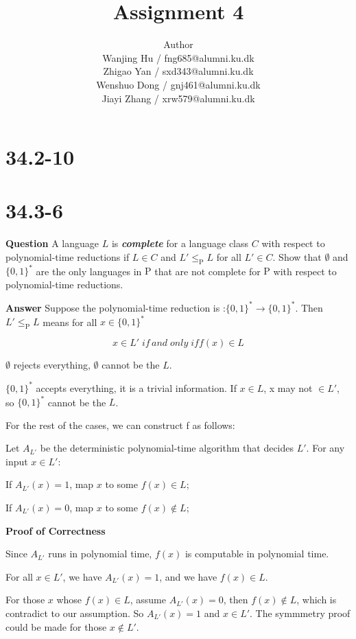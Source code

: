 \documentclass[12pt]{article}
\title{Assignment 4}
\author{Author \\
  Wanjing Hu / fng685@alumni.ku.dk  \\
  Zhigao Yan / sxd343@alumni.ku.dk  \\
  Wenshuo Dong / gnj461@alumni.ku.dk  \\
  Jiayi Zhang / xrw579@alumni.ku.dk \\
}
\begin{document}
\maketitle

\section{34.2-10}

\section{34.3-6}
\textbf{Question}
 A language $L$ is \textit{\textbf{complete}} for a language class $C$ with respect to polynomial-time reductions if $L \in C$ and $L' \le_\text{P} L$ for all $L' \in C$. Show that $\emptyset$ and $\{0, 1\}^{*}$ are the only languages in $\text{P}$ that are not complete for $\text{P}$ with respect to polynomial-time reductions.

\textbf{Answer}
Suppose the polynomial-time reduction is :$\{0, 1\}^{*} \rightarrow \{0, 1\}^{*}$. Then $L' \le_\text{P} L$ means for all $x \in \{0,1\}^{*}$

\begin{equation}
x \in L' \; if \, and \; only \; if f(x) \in  L
\end{equation}

$\emptyset$ rejects everything, $\emptyset$  cannot be the $L$.

$\{0, 1\}^{*}$ accepts everything, it is a trivial information. If $x \in L$, x may not $\in L'$, so  $\{0, 1\}^{*}$  cannot be the $L$.

For the rest of the cases, we can construct f as follows:

Let $A_{L'}$ be the deterministic polynomial-time algorithm that decides $L'$. For any input $x \in L'$:

If $A_{L'}(x)=1$, map $x$ to some $f(x) \in L$;

If $A_{L'}(x)=0$, map $x$ to some $f(x) \notin L$;

\textbf{Proof of Correctness}

Since $A_{L'}$  runs in polynomial time, $f(x)$ is computable in polynomial time.

For all $x \in L'$, we have $A_{L'}(x) = 1$, and we have $f(x) \in L$.

For those $x$ whose $f(x) \in L$, assume $A_{L'}(x)=0$, then  $f(x) \notin L$, which is contradict to our assumption. So  $A_{L'}(x)=1$ and $x \in L'$. The symmmetry proof could be made for those $x \notin L'$.
\end{document}

